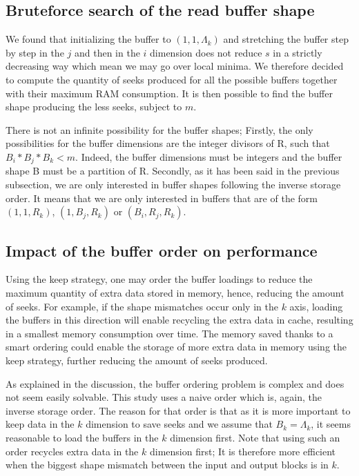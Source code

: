 \documentclass[conference]{IEEEtran}
\begin{document}
\subsection{Bruteforce search of the read buffer shape}
We found that initializing the buffer to $(1,1,\Lambda_k)$ and stretching the
buffer step by step in the $j$ and then in the $i$ dimension does not reduce
$s$ in a strictly decreasing way which mean we may go over local minima.
We therefore decided to compute the quantity of seeks produced for all the
possible buffers together with their maximum RAM consumption.
It is then possible to find the buffer shape producing the less seeks, subject
to $m$.

There is not an infinite possibility for the buffer shapes;
Firstly, the only possibilities for the buffer dimensions are the integer
divisors of R, such that $B_i*B_j*B_k < m$. Indeed, the buffer dimensions must
be integers and the buffer shape B must be a partition of R.
Secondly, as it has been said in the previous subsection, we are only
interested in buffer shapes following the inverse storage order.
It means that we are only interested in buffers that are of the form
$(1,1,R_k)$, $(1,B_j,R_k)$ or $(B_i,R_j,R_k)$.

\subsection{Impact of the buffer order on performance}
Using the keep strategy, one may order the buffer loadings to reduce the maximum
quantity of extra data stored in memory, hence, reducing the amount of seeks.
For example, if the shape mismatches occur only in the $k$ axis, loading the
buffers in this direction will enable recycling the extra data in cache,
resulting in a smallest memory consumption over time.
The memory saved thanks to a smart
ordering could enable the storage of more extra data in memory using the
keep strategy, further reducing the amount of seeks produced.

As explained in the discussion, the buffer ordering problem is complex and does
not seem easily solvable.
This study uses a naive order which is, again, the inverse storage order.
The reason for that order is that as it is more important to keep data in the
$k$ dimension to save seeks and we assume that $B_k=\Lambda_k$, it seems
reasonable to load the buffers in the $k$ dimension first.
Note that using such
an order recycles extra data in the $k$ dimension first; It is therefore
more efficient when the biggest shape mismatch between the input and output
blocks is in $k$.
\end{document}
